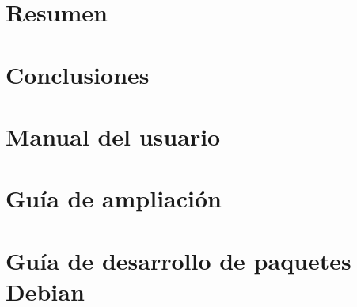 \documentclass[a4paper,12pt]{scrbook}
\begin{document}
\chapter{Resumen}
%
 
\chapter{Conclusiones}
%

\chapter{Manual del usuario}
%
 
\chapter{Guía de ampliación}
%

\appendix

\chapter{Guía de desarrollo de paquetes Debian}
%







\printindex
\end{document}
